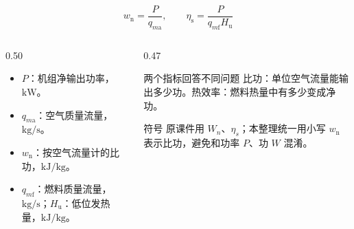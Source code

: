 \begin{frame}[t,shrink]{}
$$
w_{\mathrm{n}}=\frac{P}{q_{m\mathrm{a}}},
\qquad
\eta_{\mathrm{s}}=\frac{P}{q_{m\mathrm{f}}H_{\mathrm{u}}}
$$
\begin{columns}[T,onlytextwidth]
\begin{column}{0.50\textwidth}
  \begin{itemize}
    \item \(P\)：机组净输出功率，\(\mathrm{kW}\)。
    \item \(q_{m\mathrm{a}}\)：空气质量流量，\(\mathrm{kg/s}\)。
    \item \(w_{\mathrm{n}}\)：按空气流量计的比功，\(\mathrm{kJ/kg}\)。
    \item \(q_{m\mathrm{f}}\)：燃料质量流量，\(\mathrm{kg/s}\)；\(H_{\mathrm{u}}\)：低位发热量，\(\mathrm{kJ/kg}\)。
  \end{itemize}
\end{column}
\begin{column}{0.47\textwidth}
  \begin{keybox}{两个指标回答不同问题}
  \small 比功：单位空气流量能输出多少功。热效率：燃料热量中有多少变成净功。
  \end{keybox}
  \vspace{0.7mm}
  \begin{amberbox}{符号}
  \small 原课件用 \(W_n\)、\(\eta_s\)；本整理统一用小写 \(w_{\mathrm{n}}\) 表示比功，避免和功率 \(P\)、功 \(W\) 混淆。
  \end{amberbox}
\end{column}
\end{columns}
\end{frame}

